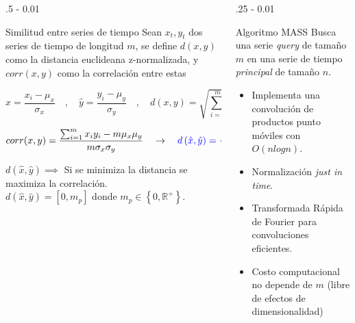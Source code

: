 \documentclass{iteraposter}\usepackage[]{graphicx}\usepackage[]{color}
\begin{document}
\begin{frame}
\begin{columns}[onlytextwidth]
\begin{column}{.5 \textwidth - 0.01 \textwidth}
\begin{block}{Similitud entre series de tiempo}
      Sean $x_{t}, y_{t}$ dos series de tiempo de longitud $m$, se define $d(x,y)$ como la
      distancia euclideana z-normalizada, y $corr(x,y)$ como la correlaci\'on entre estas
      
      \begin{equation*}
        \hat{x} = \frac{x_{i}-\mu_{x}}{\sigma_{x}} \quad , \quad
        \hat{y} = \frac{y_{i}-\mu_{y}}{\sigma_{y}} \quad , \quad
        d(x,y) = \sqrt{\sum_{i=1}^{m}(\hat{x_{i}} -\hat{y_{i}})^{2})}
      \end{equation*}

      \begin{equation*}
        corr(x,y) = \frac{\sum_{i=1}^{m} x_{i} y_{i} - m \mu_{x} \mu_{y}}{m \sigma_{x} \sigma_{y}}
        \quad \rightarrow \quad
        \color{blue}{d\left(\hat{x}, \hat{y} \right) = \sqrt{2m(1 - corr(x, y))}}
      \end{equation*}
      
      $d\left(\hat{x}, \hat{y} \right) \implies$ Si se minimiza la distancia se maximiza la correlaci\'on. \\
      $d\left(\hat{x}, \hat{y} \right) = \left[0, m_{p} \right]$ 
      donde $m_{p} \in \left\{0, \mathbb{R}^{+} \right\}$.
      
      \end{block}
  \end{column}

  \begin{column}{.25 \textwidth - 0.01 \textwidth}
    \begin{block}{Algoritmo MASS}
      Busca una serie \textit{query} de tama\~no $m$ en una serie de tiempo \textit{principal} de tama\~no $n$.
      \begin{itemize}
        \item Implementa una convoluci\'on de productos punto m\'oviles con $O(nlogn)$.
        \item Normalizaci\'on \textit{just in time}.
        \item Transformada R\'apida de Fourier para convoluciones eficientes.
        \item Costo computacional no depende de $m$ (libre de efectos de dimensionalidad)
      \end{itemize}
    \end{block}
  \end{column}
  

\end{columns}
\end{frame}
\end{document}
